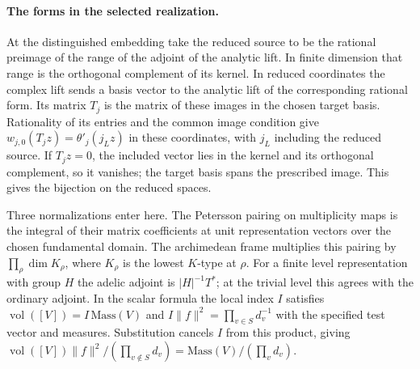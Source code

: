 \paragraph{The forms in the selected realization.}\label{frame:forms}
At the distinguished embedding take the reduced source to be the
rational preimage of the range of the adjoint of the analytic lift.
In finite dimension that range is the orthogonal complement of its
kernel. In reduced coordinates the complex lift sends a basis vector
to the analytic lift of the corresponding rational form. Its matrix
$T_j$ is the matrix of these images in the chosen target basis.
Rationality of its entries and the common image condition give
$w_{j,0}(T_j z)=\theta'_j(j_L z)$ in these coordinates, with
$j_L$ including the reduced source. If $T_j z=0$, the included vector
lies in the kernel and its orthogonal complement, so it vanishes;
the target basis spans the prescribed image. This gives the
bijection on the reduced spaces.

Three normalizations enter here. The Petersson pairing on multiplicity
maps is the integral of their matrix coefficients at unit representation
vectors over the chosen fundamental domain. The archimedean frame
multiplies this pairing by $\prod_\rho\dim K_\rho$, where $K_\rho$
is the lowest $K$-type at $\rho$. For a finite level representation
with group $H$ the adelic adjoint is $|H|^{-1}T^*$; at the trivial
level this agrees with the ordinary adjoint. In the scalar formula
the local index $I$ satisfies $\operatorname{vol}([V])=I\,\mathrm{Mass}(V)$
and $I\|f\|^2=\prod_{v\in S}d_v^{-1}$ with the specified test vector
and measures. Substitution cancels $I$ from this product, giving
$\operatorname{vol}([V])\|f\|^2/(\prod_{v\notin S}d_v)
=\mathrm{Mass}(V)/(\prod_v d_v)$.

